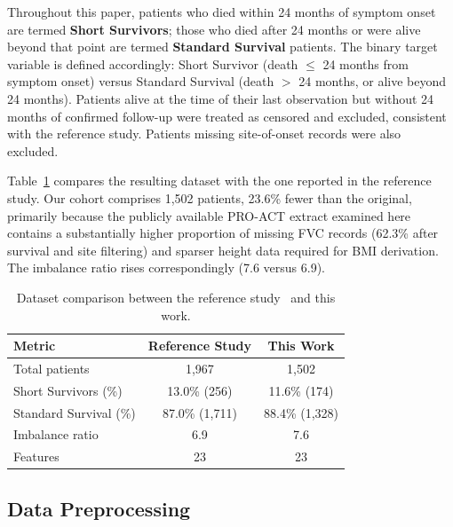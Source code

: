 \documentclass[preprint,12pt]{elsarticle}
\begin{document}
Throughout this paper, patients who died within 24 months of symptom onset are
termed \textbf{Short Survivors}; those who died after 24 months or were alive
beyond that point are termed \textbf{Standard Survival} patients. The binary target variable is defined
accordingly: Short Survivor (death $\leq$ 24 months from symptom onset) versus
Standard Survival (death $>$ 24 months, or alive beyond 24 months).
Patients alive at the time of their last observation but without
24 months of confirmed follow-up were treated as censored and excluded, consistent
with the reference study. Patients missing site-of-onset records were also excluded.

Table~\ref{tab:dataset} compares the resulting dataset with the one reported in
the reference study. Our cohort comprises 1,502 patients, 23.6\% fewer than the
original, primarily because the publicly available PRO-ACT extract examined here
contains a substantially higher proportion of missing FVC records (62.3\% after
survival and site filtering) and sparser height data required for BMI derivation.
The imbalance ratio rises correspondingly (7.6 versus 6.9).

\begin{table}[ht!]
  \centering
  \caption{Dataset comparison between the reference study~\protect\cite{Papaiz2024}
    and this work.}
  \label{tab:dataset}
  \begin{tabular}{lcc}
    \toprule
    \textbf{Metric} & \textbf{Reference Study} & \textbf{This Work} \\
    \midrule
    Total patients   & 1,967          & 1,502          \\
    Short Survivors (\%)    & 13.0\% (256)   & 11.6\% (174)   \\
    Standard Survival (\%)  & 87.0\% (1,711) & 88.4\% (1,328) \\
    Imbalance ratio  & 6.9            & 7.6            \\
    Features         & 23             & 23             \\
    \bottomrule
  \end{tabular}
\end{table}

\subsection{Data Preprocessing}
\end{document}
